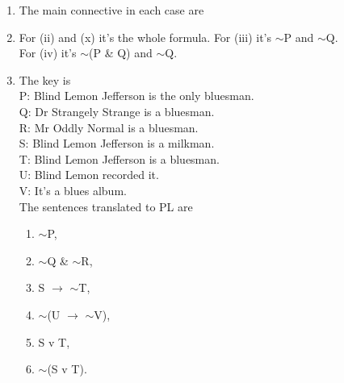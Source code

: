 \documentclass[a4paper,12pt]{article}
\newcommand{\mra}{$\rightarrow$ }
\newcommand{\ms}{$\sim$}
\begin{document}
    \begin{enumerate}[label=\arabic*,leftmargin=*]
        \item The main connective in each case are
            \nopagebreak

        \item For (ii) and (x) it's the whole formula. For (iii) it's \ms P and \ms Q.\\
            For (iv) it's \ms (P \& Q) and \ms Q.

        \item The key is\\
            P: Blind Lemon Jefferson is the only bluesman.\\
            Q: Dr Strangely Strange is a bluesman.\\
            R: Mr Oddly Normal is a bluesman.\\
            S: Blind Lemon Jefferson is a milkman.\\
            T: Blind Lemon Jefferson is a bluesman.\\
            U: Blind Lemon recorded it.\\
            V: It's a blues album.\\
            The sentences translated to PL are

            \begin{enumerate}[label=(\roman*)]
                \item \ms P,
                \item \ms Q \& \ms R,
                \item S \mra \ms T,
                \item \ms (U \mra \ms V),
                \item S v T,
                \item \ms (S v T).
            \end{enumerate}


\end{enumerate}
\end{document}
